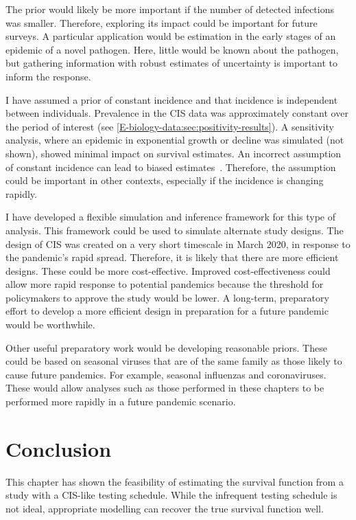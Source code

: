 \documentclass[thesis.tex]{subfiles}
\begin{document}
The prior would likely be more important if the number of detected infections was smaller.
Therefore, exploring its impact could be important for future surveys.
A particular application would be estimation in the early stages of an epidemic of a novel pathogen.
Here, little would be known about the pathogen, but gathering information with robust estimates of uncertainty is important to inform the response.

I have assumed a prior of constant incidence and that incidence is independent between individuals.
Prevalence in the CIS data was approximately constant over the period of interest (see \cref{E-biology-data:sec:positivity-results}).
A sensitivity analysis, where an epidemic in exponential growth or decline was simulated (not shown), showed minimal impact on survival estimates.
An incorrect assumption of constant incidence can lead to biased estimates~\autocite{degruttolaAnalysis}.
Therefore, the assumption could be important in other contexts, especially if the incidence is changing rapidly.

I have developed a flexible simulation and inference framework for this type of analysis.
This framework could be used to simulate alternate study designs.
The design of CIS was created on a very short timescale in March 2020, in response to the pandemic's rapid spread.
Therefore, it is likely that there are more efficient designs.
These could be more cost-effective.
Improved cost-effectiveness could allow more rapid response to potential pandemics because the threshold for policymakers to approve the study would be lower.
A long-term, preparatory effort to develop a more efficient design in preparation for a future pandemic would be worthwhile.

Other useful preparatory work would be developing reasonable priors.
These could be based on seasonal viruses that are of the same family as those likely to cause future pandemics.
For example, seasonal influenzas and coronaviruses.
These would allow analyses such as those performed in these chapters to be performed more rapidly in a future pandemic scenario.

\section{Conclusion} \label{perf-test:sec:conclusion}
This chapter has shown the feasibility of estimating the survival function from a study with a CIS-like testing schedule.
While the infrequent testing schedule is not ideal, appropriate modelling can recover the true survival function well.


\ifSubfilesClassLoaded{
  \appendix
  
  \listoftodos
}{}
\end{document}
